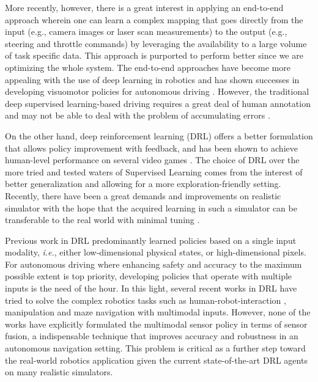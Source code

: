 \documentclass[../thesis.tex]{subfiles}
\begin{document}
More recently, however, there is a great interest in applying an end-to-end approach wherein one can learn a complex mapping that goes directly from the input (e.g., camera images or laser scan measurements) to the output (e.g., steering and throttle commands) by leveraging the availability to a large volume of task specific data. 
This approach is purported to perform better since we are optimizing the whole system. 
The end-to-end approaches have become more appealing with the use of deep learning in robotics and has shown successes in developing visuomotor policies for autonomous driving \cite{deepdriving,nvidiacar,endtoendcars}. 
However, the traditional deep supervised learning-based driving requires a great deal of human annotation and may not be able to deal with the problem of accumulating errors \cite{ross2011reduction}. 


On the other hand, deep reinforcement learning (DRL) offers a better formulation that allows policy improvement with feedback, and has been shown to achieve human-level performance on several video games \cite{mnih2013playing, mnih2015human,2016-TOG-deepRL}.
The choice of DRL over the more tried and tested waters of Supervised Learning comes from the interest of better generalization and allowing for a more exploration-friendly setting. 
Recently, there have been a great demands and improvements on realistic simulator \cite{deepdrive,udacity} with the hope that the acquired learning in such a simulator can be transferable to the real world with minimal tuning \cite{you2017virtual}. 


Previous work in DRL predominantly learned policies based on a single input modality, \textit{i.e.}, either low-dimensional physical states, or high-dimensional pixels. 
For autonomous driving where enhancing safety and accuracy to the maximum possible extent is top priority, developing policies that operate with multiple inputs is the need of the hour. 
In this light, several recent works in DRL have tried to solve the complex robotics tasks such as human-robot-interaction \cite{qureshi2016robot}, manipulation \cite{levine2016end} and maze navigation \cite{mirowski2017a} with multimodal inputs. 
However, none of the works have explicitly formulated the multimodal sensor policy in terms of sensor fusion, a indispensable technique that improves accuracy and robustness in an autonomous navigation setting. 
This problem is critical as a further step toward the real-world robotics application given the current state-of-the-art DRL agents on many realistic simulators.
\end{document}
